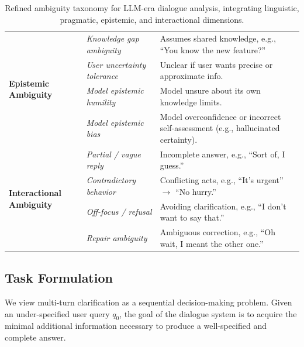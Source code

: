 \documentclass[sigconf]{acmart}
\begin{document}
\begin{table}[t]
\begin{tabular}{p{3cm} p{4cm} p{7.5cm}}
\midrule

\multirow{4}{*}{\textbf{Epistemic Ambiguity}} 
& \textit{Knowledge gap ambiguity} & Assumes shared knowledge, e.g., ``You know the new feature?'' \\
& \textit{User uncertainty tolerance} & Unclear if user wants precise or approximate info. \\
& \textit{Model epistemic humility} & Model unsure about its own knowledge limits. \\
& \textit{Model epistemic bias} & Model overconfidence or incorrect self-assessment (e.g., hallucinated certainty). \\

\midrule

\multirow{4}{*}{\textbf{Interactional Ambiguity}} 
& \textit{Partial / vague reply} & Incomplete answer, e.g., ``Sort of, I guess.'' \\
& \textit{Contradictory behavior} & Conflicting acts, e.g., ``It’s urgent'' $\rightarrow$ ``No hurry.'' \\
& \textit{Off-focus / refusal} & Avoiding clarification, e.g., ``I don’t want to say that.'' \\
& \textit{Repair ambiguity} & Ambiguous correction, e.g., ``Oh wait, I meant the other one.'' \\

\bottomrule
\end{tabular}
\caption{Refined ambiguity taxonomy for LLM-era dialogue analysis, integrating linguistic, pragmatic, epistemic, and interactional dimensions.}
\label{tab:refined-ambiguity-taxonomy}
\end{table}
\fi

\subsection{Task Formulation}

We view multi-turn clarification as a sequential decision-making problem. 
Given an under-specified user query $q_0$, the goal of the dialogue system is to acquire the minimal additional information necessary to produce a well-specified and complete answer.
\end{document}
